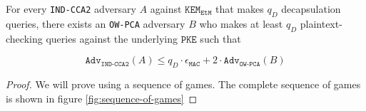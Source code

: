 \documentclass[floatrow,journal=tches,submission]{iacrtrans}
\newcommand{\pke}{\texttt{PKE}}
\newcommand{\kem}{\texttt{KEM}}
\newcommand{\etm}{\texttt{EtM}}  %
\newcommand{\mac}{\texttt{MAC}}
\begin{document}
\begin{theorem}\label{thm:ow-pca-implies-kem-ind-cca2}
    For every \texttt{IND-CCA2} adversary $A$ against $\kem_\etm$ that makes $q_D$ decapsulation queries, there exists an \texttt{OW-PCA} adversary $B$ who makes at least $q_D$ plaintext-checking queries against the underlying $\pke$ such that

    \begin{equation*}
        \texttt{Adv}_\texttt{IND-CCA2}(A) \leq q_D \cdot \epsilon_\mac + 2 \cdot \texttt{Adv}_\texttt{OW-PCA}(B)
    \end{equation*}
\end{theorem}

\begin{proof}
    We will prove using a sequence of games. The complete sequence of games is shown in figure \ref{fig:sequence-of-games}


\end{proof}
\end{document}
